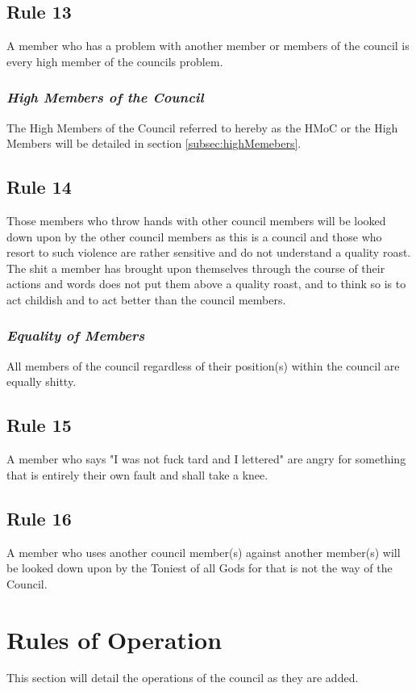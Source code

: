 \documentclass[]{article}
\begin{document}
\subsection{Rule 13}
A member who has a problem with another member or members of the council is every high member of the councils problem.
\subsubsection{\textit{High Members of the Council}}
The High Members of the Council referred to hereby as the HMoC or the High Members will be detailed in section \ref{subsec:highMemebers}.

\subsection{Rule 14}
Those members who throw hands with other council members will be looked down upon by the other council members as this is a council and those who resort to such violence are rather sensitive and do not understand a quality roast. The shit a member has brought upon themselves through the course of their actions and words does not put them above a quality roast, and to think so is to act childish and to act better than the council members.
\subsubsection{\textit{Equality of Members}}
All members of the council regardless of their position(s) within the council are equally shitty. 

\subsection{Rule 15}
A member who says "I was not fuck tard and I lettered" are angry for something that is entirely their own fault and shall take a knee.

\subsection{Rule 16}
A member who uses another council member(s) against another member(s) will be looked down upon by the Toniest of all Gods for that is not the way of the Council.

\newpage
\section{Rules of Operation}
\label{sec:rulesOperation}
This section will detail the operations of the council as they are added.
\end{document}
